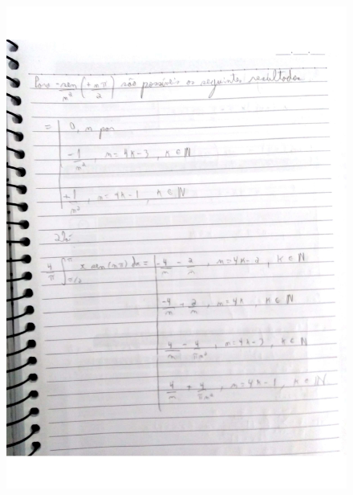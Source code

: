 \documentclass[a4paper]{article}
\begin{document}
                \begin{figure}{\textwidth}
            \centering
            \includegraphics[width=\textwidth]{Questoes-1-3_page-0011.jpg}
        \end{figure}
\end{document}
